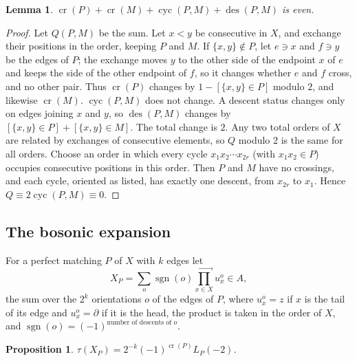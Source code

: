 \documentclass[preprint,12pt]{elsarticle}
\newtheorem{proposition}[theorem]{Proposition}
\newtheorem{lemma}[theorem]{Lemma}
\theoremstyle{definition}
\newcommand{\cro}{\operatorname{cr}}
\newcommand{\cyc}{\operatorname{cyc}}
\newcommand{\des}{\operatorname{des}}
\newcommand{\dd}{\partial}
\begin{document}
\begin{lemma}\label{lem:sign}
$\cro(P)+\cro(M)+\cyc(P,M)+\des(P,M)$ is even.
\end{lemma}

\begin{proof}
Let $Q(P,M)$ be the sum. Let $x<y$ be consecutive in $X$, and exchange their positions in the order, keeping $P$ and $M$. If $\{x,y\}\notin P$, let $e\ni x$ and $f\ni y$ be the edges of $P$; the exchange moves $y$ to the other side of the endpoint $x$ of $e$ and keeps the side of the other endpoint of $f$, so it changes whether $e$ and $f$ cross, and no other pair. Thus $\cro(P)$ changes by $1-[\{x,y\}\in P]$ modulo $2$, and likewise $\cro(M)$. $\cyc(P,M)$ does not change. A descent status changes only on edges joining $x$ and $y$, so $\des(P,M)$ changes by $[\{x,y\}\in P]+[\{x,y\}\in M]$. The total change is $2$. Any two total orders of $X$ are related by exchanges of consecutive elements, so $Q$ modulo $2$ is the same for all orders. Choose an order in which every cycle $x_1x_2\cdots x_{2r}$ (with $x_1x_2\in P$) occupies consecutive positions in this order. Then $P$ and $M$ have no crossings, and each cycle, oriented as listed, has exactly one descent, from $x_{2r}$ to $x_1$. Hence $Q\equiv2\cyc(P,M)\equiv0$.
\end{proof}

\subsection{The bosonic expansion}
For a perfect matching $P$ of $X$ with $k$ edges let
\[
X_P=\sum_{o}\operatorname{sgn}(o)\prod_{x\in X}^{\longrightarrow}u^o_x\in A,
\]
the sum over the $2^k$ orientations $o$ of the edges of $P$, where $u^o_x=z$ if $x$ is the tail of its edge and $u^o_x=\dd$ if it is the head, the product is taken in the order of $X$, and $\operatorname{sgn}(o)=(-1)^{\text{number of descents of }o}$.

\begin{proposition}\label{prop:boson}
$\tau(X_P)=2^{-k}(-1)^{\cro(P)}L_P(-2)$.
\end{proposition}
\end{document}

